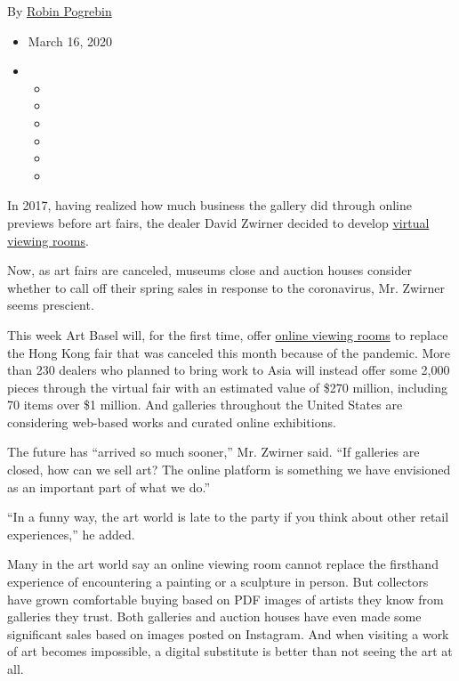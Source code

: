By \href{https://www.nytimes3xbfgragh.onion/by/robin-pogrebin}{Robin
Pogrebin}

\begin{itemize}
\item
  March 16, 2020
\item
  \begin{itemize}
  \item
  \item
  \item
  \item
  \item
  \item
  \end{itemize}
\end{itemize}

In 2017, having realized how much business the gallery did through
online previews before art fairs, the dealer David Zwirner decided to
develop
\href{https://www.davidzwirner.com/viewing-room?gclid=Cj0KCQjw3qzzBRDnARIsAECmryr-zZqbRxjtGPm2UN9nVmCH4u1xV5HjQdAj1rFZfWBYiDBgwthqw6QaAh0bEALw_wcB}{virtual
viewing rooms}.

Now, as art fairs are canceled, museums close and auction houses
consider whether to call off their spring sales in response to the
coronavirus, Mr. Zwirner seems prescient.

This week Art Basel will, for the first time, offer
\href{https://www.artbasel.com/viewing-rooms}{online viewing rooms} to
replace the Hong Kong fair that was canceled this month because of the
pandemic. More than 230 dealers who planned to bring work to Asia will
instead offer some 2,000 pieces through the virtual fair with an
estimated value of \$270 million, including 70 items over \$1 million.
And galleries throughout the United States are considering web-based
works and curated online exhibitions.

The future has ``arrived so much sooner,'' Mr. Zwirner said. ``If
galleries are closed, how can we sell art? The online platform is
something we have envisioned as an important part of what we do.''

``In a funny way, the art world is late to the party if you think about
other retail experiences,'' he added.

Many in the art world say an online viewing room cannot replace the
firsthand experience of encountering a painting or a sculpture in
person. But collectors have grown comfortable buying based on PDF images
of artists they know from galleries they trust. Both galleries and
auction houses have even made some significant sales based on images
posted on Instagram. And when visiting a work of art becomes impossible,
a digital substitute is better than not seeing the art at all.

